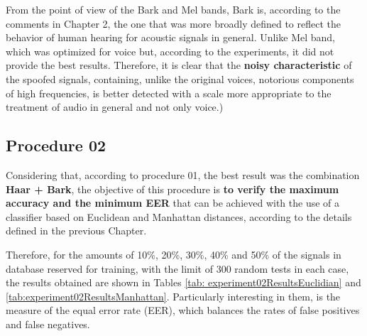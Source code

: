 \par From the point of view of the Bark and Mel bands, Bark is, according to the comments in Chapter 2, the one that was more broadly defined to reflect the behavior of human hearing for acoustic signals in general. Unlike Mel band, which was optimized for voice but, according to the experiments, it did not provide the best results. Therefore, it is clear that the \textbf{noisy characteristic} of the spoofed signals, containing, unlike the original voices, notorious components of high frequencies, is better detected with a scale more appropriate to the treatment of audio in general and not only voice.)


\subsection{Procedure 02} \label{chap:testsResults:sec:Experimento02}

\par Considering that, according to procedure 01, the best result was the combination \textbf{Haar + Bark}, the objective of this procedure is \textbf{to verify the maximum accuracy and the minimum EER} that can be achieved with the use of a classifier based on Euclidean and Manhattan distances, according to the details defined in the previous Chapter.\\

\par Therefore, for the amounts of 10\%, 20\%, 30\%, 40\% and 50\% of the signals in database reserved for training, with the limit of 300 random tests in each case, the results obtained are shown in Tables \ref{tab: experiment02ResultsEuclidian} and \ref{tab:experiment02ResultsManhattan}. Particularly interesting in them, is the measure of the equal error rate (EER), which balances the rates of false positives and false negatives.
\\

